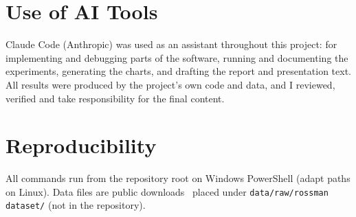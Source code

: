 \documentclass[conference]{IEEEtran}
\newcommand{\code}[1]{\texttt{\small #1}}
\begin{document}
\section*{Use of AI Tools}
Claude Code (Anthropic) was used as an assistant throughout this project: for implementing and
debugging parts of the software, running and documenting the experiments, generating the charts,
and drafting the report and presentation text. All results were produced by the project's own code
and data, and I reviewed, verified and take responsibility for the final content.

\balance



\clearpage
\onecolumn
\appendices

\section{Reproducibility}\label{app:repro}
All commands run from the repository root on Windows PowerShell (adapt paths on Linux). Data files
are public downloads~\cite{kaggle2015rossmann,kaggle2021storesales} placed under
\code{data/raw/rossman dataset/} (not in the repository).
\end{document}
